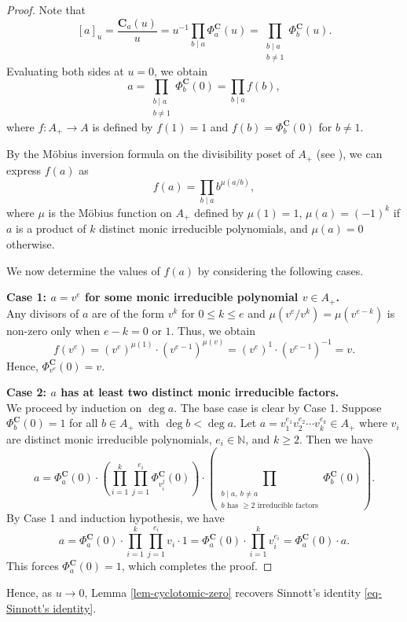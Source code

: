 \documentclass[12pt,reqno]{amsart}
\numberwithin{equation}{section}
\theoremstyle{plain}
\theoremstyle{definition}
\theoremstyle{remark}
\newcommand{\NN}{\mathbb{N}}
\newcommand{\C}{\mathbf{C}}
\begin{document}
\begin{proof}
    Note that 
    $$
    [a]_u=\frac{\C_a(u)}{u} = u^{-1}\prod_{b \mid a} \Phi^{\C}_a(u)=\prod_{\substack{b\mid a\\b\neq 1}}\Phi^{\C}_b(u).
    $$ 
    Evaluating both sides at $u=0$, we obtain 
    \[
    a = \prod_{\substack{b \mid a \\ b \neq 1}} \Phi^{\C}_b(0)=\prod_{b \mid a} f(b),
    \]
    where $f:A_+\to A$ is defined by $f(1) = 1$ and $f(b) = \Phi^{\C}_b(0)$ for $b \neq 1$.

    By the Möbius inversion formula on the divisibility poset of $A_+$ (see \cite[Section 3.7]{Stanley2011}), we can express $f(a)$ as
    $$f(a) = \prod_{b \mid a} b^{\mu(a/b)},$$
    where $\mu$ is the Möbius function on $A_+$ defined by $\mu(1) = 1$, $\mu(a) = (-1)^k$ if $a$ is a product of $k$ distinct monic irreducible polynomials, and $\mu(a) = 0$ otherwise.
     
    We now determine the values of $f(a)$ by considering the following cases.
    
    \textbf{Case 1: $a = v^e$ for some monic irreducible polynomial $v\in A_+$.} \\
    Any divisors of $a$ are of the form $v^k$ for $0 \le k \le e$ and $\mu(v^e / v^k) = \mu(v^{e-k})$ is non-zero only when $e-k = 0$ or $1$. Thus, we obtain
    \[
    f(v^e) = (v^e)^{\mu(1)} \cdot (v^{e-1})^{\mu(v)} = (v^e)^1 \cdot (v^{e-1})^{-1} = v.
    \]
    Hence, $\Phi^{\C}_{v^e}(0) = v$.

    \textbf{Case 2: $a$ has at least two distinct monic irreducible factors.} \\
We proceed by induction on $\deg a$. The base case is clear by Case 1. Suppose $\Phi^{\C}_b(0) = 1$ for all $b\in A_+$ with $\deg b<\deg a$. Let $a=v_1^{e_1}v_2^{e_2}\cdots v_k^{e_k}\in A_+$ where $v_i$ are distinct monic irreducible polynomials, $e_i\in \NN$, and $k\geq 2$. Then we have 
\[
a = \Phi^{\C}_a(0) \cdot \left( \prod_{i=1}^k \prod_{j=1}^{e_i} \Phi^{\C}_{v_i^j}(0) \right) \cdot \left( \prod_{\substack{b \mid a, \ b \neq a \\ b \text{ has } \ge 2 \text{ irreducible factors}}} \Phi^{\C}_b(0) \right).
\]
By Case 1 and induction hypothesis, we have
\[
a=\Phi^{\C}_a(0)\cdot\prod_{i=1}^k \prod_{j=1}^{e_i} v_i\cdot 1=\Phi_a^{\C}(0)\cdot\prod_{i=1}^k v_i^{e_i}=\Phi_a^{\C}(0)\cdot a.
\]
This forces $\Phi_a^{\C}(0)=1$, which completes the proof.
\end{proof}

Hence, as $u \to 0$, Lemma \ref{lem-cyclotomic-zero} recovers Sinnott's identity \eqref{eq-Sinnott's identity}.
\end{document}
